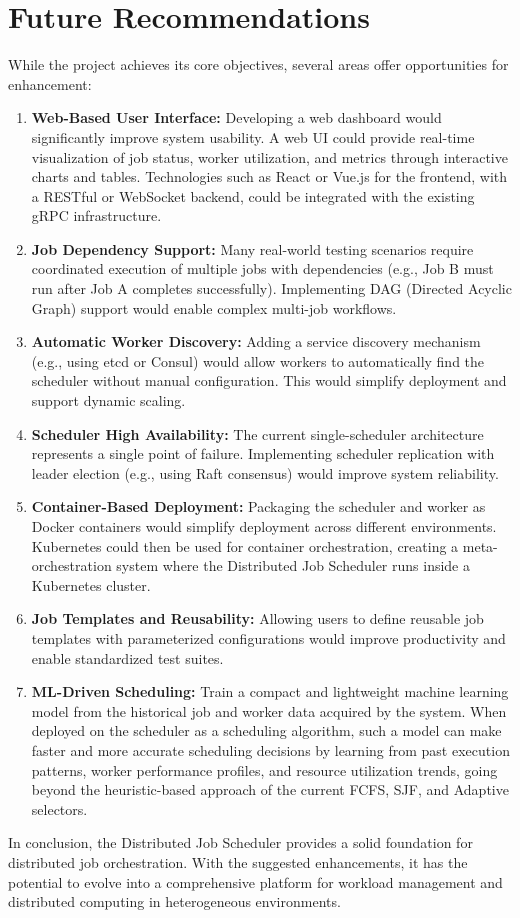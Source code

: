 \section{Future Recommendations}

While the project achieves its core objectives, several areas offer opportunities for enhancement:

\begin{enumerate}
	\item \textbf{Web-Based User Interface:} Developing a web dashboard would significantly improve system usability. A web UI could provide real-time visualization of job status, worker utilization, and metrics through interactive charts and tables. Technologies such as React or Vue.js for the frontend, with a RESTful or WebSocket backend, could be integrated with the existing gRPC infrastructure.

	\item \textbf{Job Dependency Support:} Many real-world testing scenarios require coordinated execution of multiple jobs with dependencies (e.g., Job B must run after Job A completes successfully). Implementing DAG (Directed Acyclic Graph) support would enable complex multi-job workflows.

	\item \textbf{Automatic Worker Discovery:} Adding a service discovery mechanism (e.g., using etcd or Consul) would allow workers to automatically find the scheduler without manual configuration. This would simplify deployment and support dynamic scaling.

	\item \textbf{Scheduler High Availability:} The current single-scheduler architecture represents a single point of failure. Implementing scheduler replication with leader election (e.g., using Raft consensus) would improve system reliability.

	\item \textbf{Container-Based Deployment:} Packaging the scheduler and worker as Docker containers would simplify deployment across different environments. Kubernetes could then be used for container orchestration, creating a meta-orchestration system where the Distributed Job Scheduler runs inside a Kubernetes cluster.

	\item \textbf{Job Templates and Reusability:} Allowing users to define reusable job templates with parameterized configurations would improve productivity and enable standardized test suites.

	\item \textbf{ML-Driven Scheduling:} Train a compact and lightweight machine learning model from the historical job and worker data acquired by the system. When deployed on the scheduler as a scheduling algorithm, such a model can make faster and more accurate scheduling decisions by learning from past execution patterns, worker performance profiles, and resource utilization trends, going beyond the heuristic-based approach of the current FCFS, SJF, and Adaptive selectors.
\end{enumerate}

In conclusion, the Distributed Job Scheduler provides a solid foundation for distributed job orchestration. With the suggested enhancements, it has the potential to evolve into a comprehensive platform for workload management and distributed computing in heterogeneous environments.
